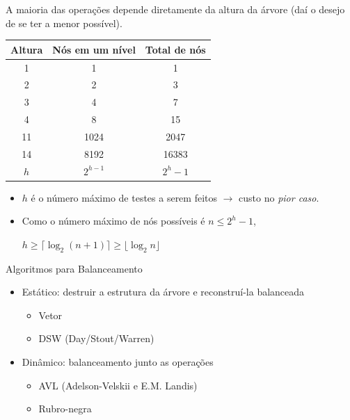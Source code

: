 \begin{frame}[label=notas]
	A maioria das operações depende diretamente da altura da árvore (daí o desejo de se ter a menor possível).
	\begin{center}
		\large
		\begin{tabular}{| c | c | c |}
			\hline
			\textbf{Altura} & \textbf{Nós em um nível} & \textbf{Total de nós} \\\hline
			1 & 1 & 1 \\\hline
			2 & 2 & 3 \\\hline
			3 & 4 & 7 \\\hline
			4 & 8 & 15 \\\hline
			11 & 1024 & 2047 \\\hline
			14 & 8192 & 16383 \\\hline
			$h$ & $2^{h-1}$ & $2^h-1$ \\\hline
		\end{tabular}
	\end{center}
	\begin{itemize}
		\item $h$ é o número \alert{máximo} de testes a serem feitos \pause $\rightarrow$ custo no \emph{pior caso}.
		\item Como o número máximo de nós possíveis é $n \le 2^h-1$,
		\begin{center}
			$h\ge\lceil\log_2(n+1)\rceil\ge \lfloor\log_2 n\rfloor$
		\end{center}
	\end{itemize}
\end{frame}

\begin{frame}[label=notas]
	Algoritmos para Balanceamento
	\begin{itemize}
		\item Estático: destruir a estrutura da árvore e reconstruí-la balanceada
			\begin{itemize}
				\item Vetor
				\item DSW (Day/Stout/Warren)
			\end{itemize}
		\item Dinâmico: balanceamento junto as operações
			\begin{itemize}
				\item AVL (Adelson-Velskii e E.M. Landis)
				\item Rubro-negra
			\end{itemize}
	\end{itemize}
\end{frame}

